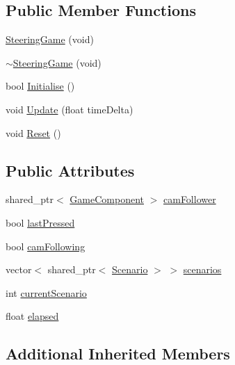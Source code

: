 \subsection*{Public Member Functions}
\begin{DoxyCompactItemize}
\item 
\hyperlink{class_b_g_e_1_1_steering_game_a063076d55116b880495a0f7f4e995b21}{Steering\-Game} (void)
\item 
\hyperlink{class_b_g_e_1_1_steering_game_a30bd64861bac498160ef7631040d7e79}{$\sim$\-Steering\-Game} (void)
\item 
bool \hyperlink{class_b_g_e_1_1_steering_game_ae0536228be79c785e43bc7c4d841c5bc}{Initialise} ()
\item 
void \hyperlink{class_b_g_e_1_1_steering_game_a09cc97712a026e87a229117021998153}{Update} (float time\-Delta)
\item 
void \hyperlink{class_b_g_e_1_1_steering_game_a516711f65d11ecb9a694f0139859d1c8}{Reset} ()
\end{DoxyCompactItemize}
\subsection*{Public Attributes}
\begin{DoxyCompactItemize}
\item 
shared\-\_\-ptr$<$ \hyperlink{class_b_g_e_1_1_game_component}{Game\-Component} $>$ \hyperlink{class_b_g_e_1_1_steering_game_a35af13959fa40a2ddea87f2128f36db0}{cam\-Follower}
\item 
bool \hyperlink{class_b_g_e_1_1_steering_game_ad721abc4f835ee7a164e6ce8ed72f88b}{last\-Pressed}
\item 
bool \hyperlink{class_b_g_e_1_1_steering_game_a7aad64bdb402cbb6a37c74d2f7aed290}{cam\-Following}
\item 
vector$<$ shared\-\_\-ptr$<$ \hyperlink{class_b_g_e_1_1_scenario}{Scenario} $>$ $>$ \hyperlink{class_b_g_e_1_1_steering_game_a974e16b0d6fee03ac5d0e5cef9fc8643}{scenarios}
\item 
int \hyperlink{class_b_g_e_1_1_steering_game_aa84a9a6d13bc47b1ee1fd933678735f9}{current\-Scenario}
\item 
float \hyperlink{class_b_g_e_1_1_steering_game_aface673df656d6c4c1483e50d87cc263}{elapsed}
\end{DoxyCompactItemize}
\subsection*{Additional Inherited Members}



